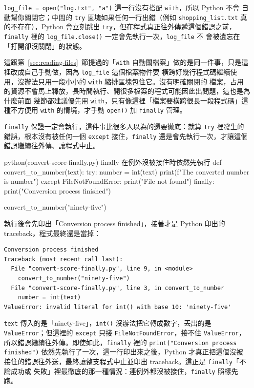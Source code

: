 
\texttt{log\_file = open("log.txt", "a")} 這一行沒有搭配 \texttt{with}，所以 Python 不會
自動幫你關閉它；中間的 \texttt{try} 區塊如果任何一行出錯（例如 \texttt{shopping\_list.txt}
真的不存在），Python 會立刻跳出 \texttt{try}，但在程式真正往外傳遞這個錯誤之前，
\texttt{finally} 裡的 \texttt{log\_file.close()} 一定會先執行一次，\texttt{log\_file} 不
會被遺忘在「打開卻沒關閉」的狀態。

這跟第~\ref{sec:reading-files}~節提過的「\texttt{with}
自動關檔案」做的是同一件事，只是這裡改成自己手動做，因為 \texttt{log\_file} 這個檔案物件要
橫跨好幾行程式碼繼續使用，沒辦法只用一段小小的 \texttt{with} 縮排區塊包住它。沒有明確關閉的
檔案，占用的資源不會馬上釋放，長時間執行、開很多檔案的程式可能因此出問題，這也是為什麼前面
幾節都建議優先用 \texttt{with}，只有像這裡「檔案要橫跨很長一段程式碼」這種不方便用
\texttt{with} 的情境，才手動 \texttt{open()} 加 \texttt{finally} 管理。

\texttt{finally} 保證一定會執行，這件事比很多人以為的還要徹底：就算 \texttt{try} 裡發生的
錯誤，根本沒有被任何一個 \texttt{except} 接住，\texttt{finally} 還是會先執行一次，才讓這個
錯誤繼續往外傳、讓程式中止。

\begin{example}{python}{(convert-score-finally.py) finally 在例外沒被接住時依然先執行}
def convert_to_number(text):
    try:
        number = int(text)
        print(f"The converted number is {number}")
    except FileNotFoundError:
        print("File not found")
    finally:
        print("Conversion process finished")

convert_to_number("ninety-five")
\end{example}

執行後會先印出「Conversion process finished」，接著才是 Python 印出的 traceback，程式最終還是當掉：

\begin{verbatim}
Conversion process finished
Traceback (most recent call last):
  File "convert-score-finally.py", line 9, in <module>
    convert_to_number("ninety-five")
  File "convert-score-finally.py", line 3, in convert_to_number
    number = int(text)
ValueError: invalid literal for int() with base 10: 'ninety-five'
\end{verbatim}

\texttt{text} 傳入的是「ninety-five」，\texttt{int()} 沒辦法把它轉成數字，丟出的是
\texttt{ValueError}；但這裡的 \texttt{except} 只接 \texttt{FileNotFoundError}，接不住
\texttt{ValueError}，所以錯誤繼續往外傳。即使如此，\texttt{finally} 裡的
\texttt{print("Conversion process finished")} 依然先執行了一次，這一行印出來之後，Python 才真正把這個沒被
接住的錯誤往外送，最終讓整支程式中止並印出 traceback。這正是 \texttt{finally}「不論成功或
失敗」裡最徹底的那一種情況：連例外都沒被接住，\texttt{finally} 照樣先跑。

